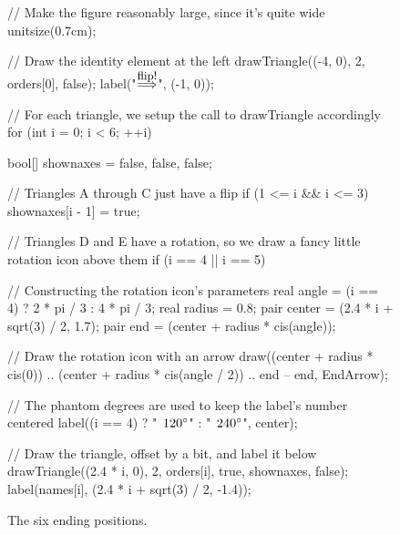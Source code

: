 \documentclass[../textbook.tex]{subfiles}
\begin{document}
\begin{figure}[h]
	\begin{center}
		\begin{minipage}[b]{\textwidth}
			\centering
			\begin{asy}
				// Make the figure reasonably large, since it's quite wide
				unitsize(0.7cm);

				// Draw the identity element at the left
				drawTriangle((-4, 0), 2, orders[0], false);
				label("$\stackrel{\mbox{\small flip!}}{\Longrightarrow}$", (-1, 0));

				// For each triangle, we setup the call to drawTriangle accordingly
				for (int i = 0; i < 6; ++i) {
					bool[] shownaxes = {false, false, false};

					// Triangles A through C just have a flip
					if (1 <= i && i <= 3) {
						shownaxes[i - 1] = true;
					}

					// Triangles D and E have a rotation, so we draw a fancy little rotation icon above them
					if (i == 4 || i == 5) {
						// Constructing the rotation icon's parameters
						real angle = (i == 4) ? 2 * pi / 3 : 4 * pi / 3;
						real radius = 0.8;
						pair center = (2.4 * i + sqrt(3) / 2, 1.7);
						pair end = (center + radius * cis(angle));

						// Draw the rotation icon with an arrow
						draw((center + radius * cis(0)) .. (center + radius * cis(angle / 2)) .. end -- end, EndArrow);

						// The phantom degrees are used to keep the label's number centered
						label((i == 4) ? "$\phantom{\degree}120\degree$" : "$\phantom{\degree}240\degree$", center);
					}

					// Draw the triangle, offset by a bit, and label it below
					drawTriangle((2.4 * i, 0), 2, orders[i], true, shownaxes, false);
					label(names[i], (2.4 * i + sqrt(3) / 2, -1.4));
				}
			\end{asy}
		\end{minipage}
	\end{center}
	\vspace*{-2\baselineskip}
	\begin{center}
		\begin{minipage}[t]{\textwidth}
			\caption{The six ending positions.}
			\label{fig:triangle_isos_sf}
		\end{minipage}
	\end{center}
	\vspace*{-2\baselineskip}
\end{figure}

\end{document}
